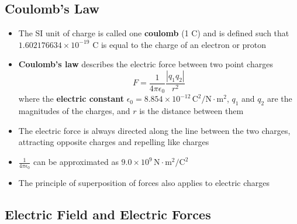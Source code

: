 \documentclass{article}
\begin{document}
\subsection{Coulomb's Law}

\begin{itemize}
  \item The SI unit of charge is called one \textbf{coulomb} (1 C) and is defined such that $1.602176634\times10^{-19}$ C is equal to the charge of an electron or proton

  \item \textbf{Coulomb's law} describes the electric force between two point charges \[F = \frac{1}{4\pi\epsilon_0}\frac{|q_1q_2|}{r^2}\] where the \textbf{electric constant} $\epsilon_0 = 8.854 \times 10^{-12}\,\textrm{C}^2/\textrm{N}\cdot \textrm{m}^2$, $q_1$ and $q_2$ are the magnitudes of the charges, and $r$ is the distance between them

  \item The electric force is always directed along the line between the two charges, attracting opposite charges and repelling like charges

  \item $\frac{1}{4\pi\epsilon_0}$ can be approximated as $9.0 \times 10^9\,\textrm{N}\cdot\textrm{m}^2/\textrm{C}^2$

  \item The principle of superposition of forces also applies to electric charges
\end{itemize}

\subsection{Electric Field and Electric Forces}
\end{document}
